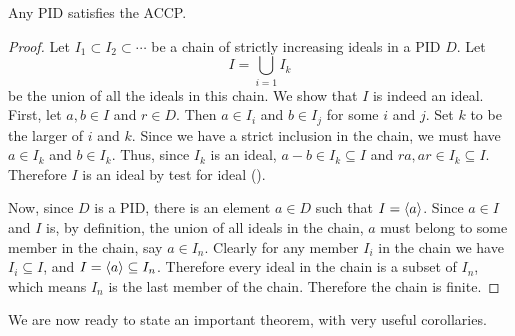 \begin{lemma}\label{lemma-pid-satisfies-accp}
    Any PID satisfies the ACCP.
\end{lemma}
\begin{proof}
    Let $I_1 \subset I_2 \subset \cdots$ be a chain of strictly increasing ideals in a PID $D$. Let
    \[
        I = \bigcup_{i=1} I_k
    \]
    be the union of all the ideals in this chain. We show that $I$ is indeed an ideal. First, let $a,b\in I$ and $r \in D$. Then $a \in I_i$ and $b \in I_j$ for some $i$ and $j$. Set $k$ to be the larger of $i$ and $k$. Since we have a strict inclusion in the chain, we must have $a \in I_k$ and $b \in I_k$. Thus, since $I_k$ is an ideal, $a - b \in I_k \subseteq I$ and $ra, ar \in I_k \subseteq I$. Therefore $I$ is an ideal by test for ideal ().

    Now, since $D$ is a PID, there is an element $a \in D$ such that $I = \left\langle a\right\rangle$. Since $a \in I$ and $I$ is, by definition, the union of all ideals in the chain, $a$ must belong to some member in the chain, say $a \in I_n$. Clearly for any member $I_i$ in the chain we have $I_i \subseteq I$, and $I = \left\langle a\right\rangle \subseteq I_n$. Therefore every ideal in the chain is a subset of $I_n$, which means $I_n$ is the last member of the chain. Therefore the chain is finite.
\end{proof}

We are now ready to state an important theorem, with very useful corollaries.

